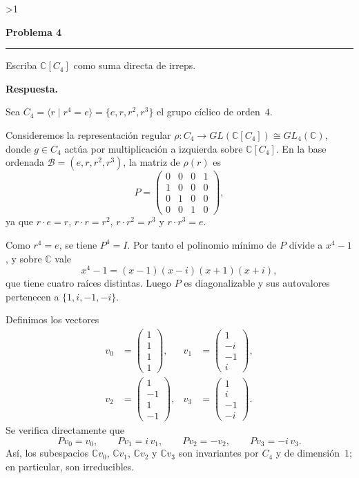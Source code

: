 \documentclass[10pt,a4paper]{article}
\newcommand{\CC}{\mathbb{C}}
\newcommand{\inlinehead}[2][repblue]{%
  \par\smallskip
  {\color{#1}\bfseries #2.}\hspace{0.45em}%
}
\newcommand{\answer}{\inlinehead{Respuesta}}
\newcounter{probcnt}
\newcommand{\problem}[2]{%
  \stepcounter{probcnt}%
  \ifnum\value{probcnt}>1\newpage\fi
  \par\vspace{0.25em}
  {\large\bfseries\color{repblue} Problema #1}\par
  {\color{repline}\rule{\linewidth}{0.55pt}}\par
  \begin{tcolorbox}[
    breakable,
    colback=white,
    colframe=repline,
    borderline west={1.6pt}{0pt}{repteal},
    left=0.7em,
    right=0.7em,
    top=0.35em,
    bottom=0.3em,
    before skip=0.35em,
    after skip=0.45em
  ]
    #2
  \end{tcolorbox}
}
\begin{document}
\problem{4}{%
Escriba $\CC[C_4]$ como suma directa de irreps.
}

\answer
Sea $C_4=\langle r\mid r^4=e\rangle=\{e,r,r^2,r^3\}$ el grupo cíclico de orden~$4$.

Consideremos la representación regular
$\rho\colon C_4\to GL(\CC[C_4])\cong GL_4(\CC)$,
donde $g\in C_4$ actúa por multiplicación a izquierda sobre $\CC[C_4]$.
En la base ordenada $\mathcal B=(e,r,r^2,r^3)$, la matriz de $\rho(r)$ es
\[
  P=
  \begin{pmatrix}
    0&0&0&1\\
    1&0&0&0\\
    0&1&0&0\\
    0&0&1&0
  \end{pmatrix},
\]
ya que $r\cdot e=r$, $r\cdot r=r^2$, $r\cdot r^2=r^3$ y $r\cdot r^3=e$.

Como $r^4=e$, se tiene $P^4=I$. Por tanto el polinomio mínimo de $P$
divide a $x^4-1$, y sobre $\CC$ vale
\[
  x^4-1=(x-1)(x-i)(x+1)(x+i),
\]
que tiene cuatro raíces distintas. Luego $P$ es diagonalizable y sus autovalores
pertenecen a $\{1,i,-1,-i\}$.

Definimos los vectores
\[
  \begin{aligned}
    v_0&=\begin{pmatrix}1\\1\\1\\1\end{pmatrix},
    & v_1&=\begin{pmatrix}1\\-i\\-1\\i\end{pmatrix},\\[0.35em]
    v_2&=\begin{pmatrix}1\\-1\\1\\-1\end{pmatrix},
    & v_3&=\begin{pmatrix}1\\i\\-1\\-i\end{pmatrix}.
  \end{aligned}
\]
Se verifica directamente que
\[
  Pv_0=v_0,
  \qquad
  Pv_1=i\,v_1,
  \qquad
  Pv_2=-v_2,
  \qquad
  Pv_3=-i\,v_3.
\]
Así, los subespacios $\CC v_0$, $\CC v_1$, $\CC v_2$ y $\CC v_3$
son invariantes por $C_4$ y de dimensión~$1$; en particular, son irreducibles.
\end{document}
